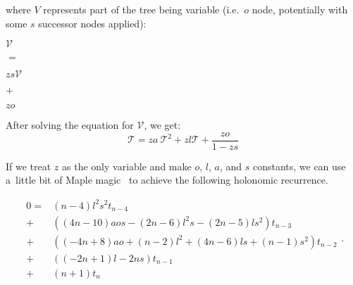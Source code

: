 \documentclass[final]{article}
\theoremstyle{definition}
\theoremstyle{definition}
\theoremstyle{remark}
\newcommand{\gf}[1]{\ensuremath{\mathcal{#1}}}
\begin{document}
where \(V\) represents part of the tree being variable (i.e.~\(o\) node, potentially with some \(s\) successor nodes applied):

\begin{center}
    \begin{minipage}[t]{.2\textwidth}
        \begin{center}
            \(\gf{V}\)\\
        \end{center}
    \end{minipage}%
    \begin{minipage}[t]{.05\textwidth}
        \begin{center}
            \(=\)\\
        \end{center}
    \end{minipage}%
    \begin{minipage}[t]{.2\textwidth}
        \begin{center}
            \(z s \gf{V}\)\\
        \end{center}
    \end{minipage}%
    \begin{minipage}[t]{.05\textwidth}
        \begin{center}
            \(+\)\\
        \end{center}
    \end{minipage}%
    \begin{minipage}[t]{.2\textwidth}
        \begin{center}
            \(z o\)\\
        \end{center}
    \end{minipage}%
\end{center}

After solving the equation for \(\gf{V}\), we get:
\[\gf{T} = z a~\gf{T}^2 + z l \gf{T} + \frac{z o}{1 - z s}\]

If we treat \(z\) as the only variable and make \(o\), \(l\), \(a\), and \(s\) constants, we can use a~little bit of Maple magic~\cite{gfun} to achieve the following holonomic recurrence.

\[\begin{array}{rl}
        0 =& (n - 4) l^2 s^2 t_{n - 4}\\
        +& ((4 n - 10) a o s - (2 n - 6) l^2 s - (2 n - 5) l s^2) t_{n - 3}\\
        +& ((-4 n + 8) a o + (n - 2) l^2 + (4 n - 6) l s + (n - 1) s^2) t_{n - 2}\\
        +& ((-2 n + 1) l - 2 n s) t_{n - 1}\\
        +& (n + 1) t_{n}
\end{array}.\]
\end{document}
